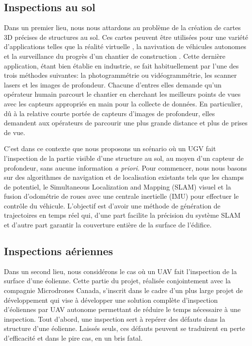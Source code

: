 \subsection{Inspections au sol}
Dans un premier lieu, nous nous attardons au problème de la création de cartes 3D précises de structures au sol. Ces cartes peuvent être utilisées pour une variété d'applications telles que la réalité virtuelle \citep{googlevr2017}, la navivation de véhicules autonomes \citep{deepmap2017} et la surveillance du progrès d'un chantier de construction \citep{Omar2018}. Cette dernière application, étant bien établie en industrie, se fait habituellement par l'une des trois méthodes suivantes: la photogrammétrie ou vidéogrammétrie, les scanner lasers et les images de profondeur. Chacune d'entres elles demande qu'un opérateur humain parcourt le chantier en cherchant les meilleurs points de vues avec les capteurs appropriés en main pour la collecte de données. En particulier, dû à la relative courte portée de capteurs d'images de profondeur, elles demandent aux opérateurs de parcourir une plus grande distance et plus de prises de vue.

C'est dans ce contexte que nous proposons un scénario où un UGV fait l'inspection de la partie visible d'une structure au sol, au moyen d'un capteur de profondeur, sans aucune information \textit{a priori}. Pour commencer, nous nous basons sur des algorithmes de navigation et de localisation existants tels que les champs de potentiel, le Simultaneous Localization and Mapping (SLAM) visuel et la fusion d'odométrie de roues avec une centrale inertielle (IMU) pour effectuer le contrôle du véhicule. L'objectif est d'avoir une méthode de génération de trajectoires en temps réel qui, d'une part facilite la précision du système SLAM et d'autre part garantir la couverture entière de la surface de l'édifice.

\subsection{Inspections aériennes}
Dans un second lieu, nous considérons le cas où un UAV fait l'inspection de la surface d'une éolienne. Cette partie du projet, réalisée conjointement avec la compagnie Microdrones Canada, s'inscrit dans le cadre d'un plus large projet de développement qui vise à développer une solution complète d'inspection d'éoliennes par UAV autonome permettant de réduire le temps nécessaire à une inspection. Tout d'abord, une inspection sert à repérer des défauts dans la structure d'une éolienne. Laissés seuls, ces défauts peuvent se traduirent en perte d'efficacité et dans le pire cas, en un bris fatal.

